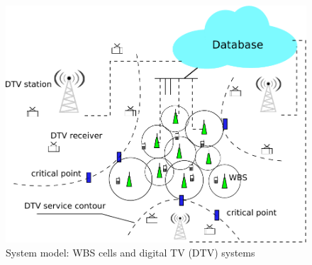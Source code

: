 \documentclass[times]{ettauth}
\theoremstyle{mytheoremstyle}
\theoremstyle{mytheoremstyle}
\theoremstyle{mytheoremstyle}
\begin{document}
\begin{figure}[h!]
  \centering
  \includegraphics[width=0.9\linewidth]{systemmodel_working.pdf}
  \caption{System model: WBS cells and digital TV (DTV) systems}
\label{sysmodel}
\end{figure}
\end{document}

